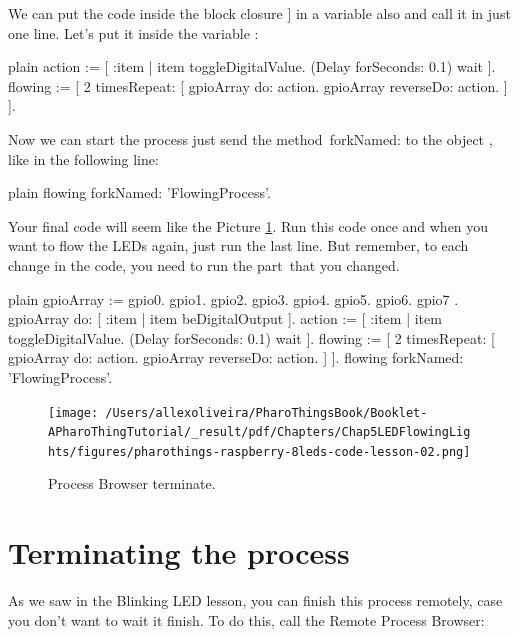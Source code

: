 \documentclass[10pt,twoside,english]{_support/latex/sbabook/sbabook}
\begin{document}
We can put the code inside the block closure \symbol{34}{[} {]} in a variable also and call it in just one line. Let's put it inside the variable :

\begin{displaycode}{plain}
action := [ :item | item toggleDigitalValue. (Delay forSeconds: 0.1) wait ].
flowing := [ 2 timesRepeat: [
    gpioArray do: action.
    gpioArray reverseDo: action.
] ].
\end{displaycode}

Now we can start the process just send the method forkNamed: to the object , like in the following line:

\begin{displaycode}{plain}
flowing forkNamed: 'FlowingProcess'.
\end{displaycode}

Your final code will seem like the Picture \ref{Process8LEDs}. Run this code once and when you want to flow the LEDs again, just run the last line. But remember, to each change in the code, you need to run the part that you changed. 

\begin{displaycode}{plain}
gpioArray := { gpio0. gpio1. gpio2. gpio3. gpio4. gpio5. gpio6. gpio7 }.
gpioArray do: [ :item | item beDigitalOutput ].
action := [ :item | item toggleDigitalValue. (Delay forSeconds: 0.1) wait ].
flowing := [ 2 timesRepeat: [
	gpioArray do: action.
	gpioArray reverseDo: action.
] ].
flowing forkNamed: 'FlowingProcess'.
\end{displaycode}


\begin{figure}

\begin{center}
\texttt{[image: /Users/allexoliveira/PharoThingsBook/Booklet-APharoThingTutorial/\_result/pdf/Chapters/Chap5LEDFlowingLights/figures/pharothings-raspberry-8leds-code-lesson-02.png]}\caption{Process Browser terminate.\label{Process8LEDs}}\end{center}
\end{figure}

\section{Terminating the process}
As we saw in the Blinking LED lesson, you can finish this process remotely, case you don’t want to wait it finish. To do this, call the Remote Process Browser:
\end{document}

